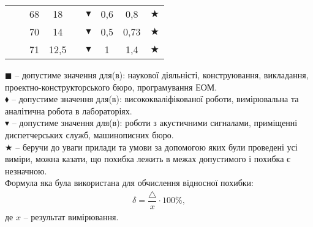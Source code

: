 \documentclass[a4paper,14pt]{extreport}
\begin{document}
\begin{landscape}
\begin{table}[h]
\begin{tabular}{|c|c|c|c|c|c|c|c|c|}
                       &                                                                               &     68      &    18        &                    &   $\blacktriangledown$      &       0,6         &             0,8 &                                                                                      $\bigstar$                    \\ \cline{3-4} \cline{6-9}
                       &                                                                     &     70     &      14      &                    &      $\blacktriangledown$     &    0,5            &             0,73 &                                                                              $\bigstar$                            \\ \cline{3-4} \cline{6-9}
                       &                                                                       &     71     &      12,5      &                    &    $\blacktriangledown$   &       1         &             1,4 &                                                                                  $\bigstar$                        \\ \hline
\end{tabular}
\end{table}
\par
$\blacksquare$  -- допустиме значення для(в): наукової діяльністі, конструювання, викладання, проектно-конструкторського бюро, програмування ЕОМ.\\

$\blacklozenge$ -- допустиме значення для(в): висококваліфікованої роботи, вимірювальна та аналітична робота в лабораторіях.\\

$\blacktriangledown$ -- допустиме значення для(в): роботи з акустичними сигналами, приміщенні диспетчерських служб, машинописних бюро. \\

$\bigstar$ -- беручи до уваги прилади та умови за допомогою яких були проведені усі виміри, можна казати, що похибка лежить в межах допустимого і похибка є незначною.\\

Формула яка була використана для обчислення відносної похибки:
\begin{align}
  \delta = \dfrac{\triangle}{x}\cdot 100\%,
\end{align}
де $x$ -- результат вимірювання.

\end{landscape}
\end{document}
